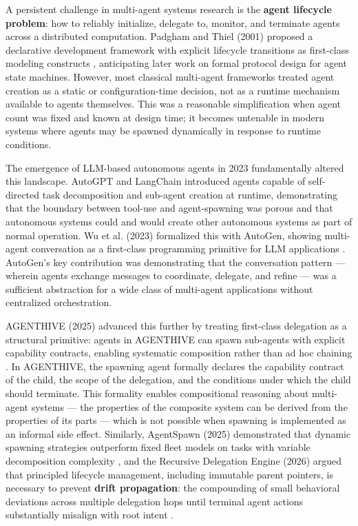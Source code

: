 {{A persistent challenge in multi-agent systems research is the \textbf{agent lifecycle problem}: how to reliably initialize, delegate to, monitor, and terminate agents across a distributed computation. Padgham and Thiel (2001) proposed a declarative development framework with explicit lifecycle transitions as first-class modeling constructs \cite{padgham2001}, anticipating later work on formal protocol design for agent state machines. However, most classical multi-agent frameworks treated agent creation as a static or configuration-time decision, not as a runtime mechanism available to agents themselves. This was a reasonable simplification when agent count was fixed and known at design time; it becomes untenable in modern systems where agents may be spawned dynamically in response to runtime conditions.

The emergence of LLM-based autonomous agents in 2023 fundamentally altered this landscape. AutoGPT \cite{autoGPT2023} and LangChain \cite{langchain2023} introduced agents capable of self-directed task decomposition and sub-agent creation at runtime, demonstrating that the boundary between tool-use and agent-spawning was porous and that autonomous systems could and would create other autonomous systems as part of normal operation. Wu et al. (2023) formalized this with AutoGen, showing multi-agent conversation as a first-class programming primitive for LLM applications \cite{autogen2023}. AutoGen's key contribution was demonstrating that the conversation pattern — wherein agents exchange messages to coordinate, delegate, and refine — was a sufficient abstraction for a wide class of multi-agent applications without centralized orchestration.

AGENTHIVE (2025) advanced this further by treating first-class delegation as a structural primitive: agents in AGENTHIVE can spawn sub-agents with explicit capability contracts, enabling systematic composition rather than ad hoc chaining \cite{agenthive2025}. In AGENTHIVE, the spawning agent formally declares the capability contract of the child, the scope of the delegation, and the conditions under which the child should terminate. This formality enables compositional reasoning about multi-agent systems — the properties of the composite system can be derived from the properties of its parts — which is not possible when spawning is implemented as an informal side effect. Similarly, AgentSpawn (2025) demonstrated that dynamic spawning strategies outperform fixed fleet models on tasks with variable decomposition complexity \cite{agentspawn2025}, and the Recursive Delegation Engine (2026) argued that principled lifecycle management, including immutable parent pointers, is necessary to prevent \textbf{drift propagation}: the compounding of small behavioral deviations across multiple delegation hops until terminal agent actions substantially misalign with root intent \cite{rde2026}.

}}
